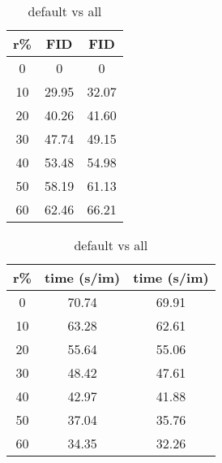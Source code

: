 \begin{table}
    \begin{minipage}{0.48\textwidth}
        \centering
        \begin{tabular}{|c|c|c|}
            \hline
            r\% & FID & FID \\
            \hline
            0 & 0 & 0 \\
            10 & 29.95 & 32.07 \\
            20 & 40.26 & 41.60 \\
            30 & 47.74 & 49.15 \\
            40 & 53.48 & 54.98 \\
            50 & 58.19 & 61.13 \\
            60 & 62.46 & 66.21 \\
            \hline
        \end{tabular}
        \caption{default vs all}
        \label{tab:table1}
    \end{minipage}
    \hfill
    \begin{minipage}{0.48\textwidth}
        \centering
        \begin{tabular}{|c|c|c|}
            \hline
            r\% & time (s/im) & time (s/im) \\
            \hline
            0 & 70.74 & 69.91 \\
            10 & 63.28 & 62.61 \\
            20 & 55.64 & 55.06 \\
            30 & 48.42 & 47.61 \\
            40 & 42.97 & 41.88 \\
            50 & 37.04 & 35.76 \\
            60 & 34.35 & 32.26 \\
            \hline
        \end{tabular}
        \caption{default vs all}
        \label{tab:table2}
    \end{minipage}
\end{table}
